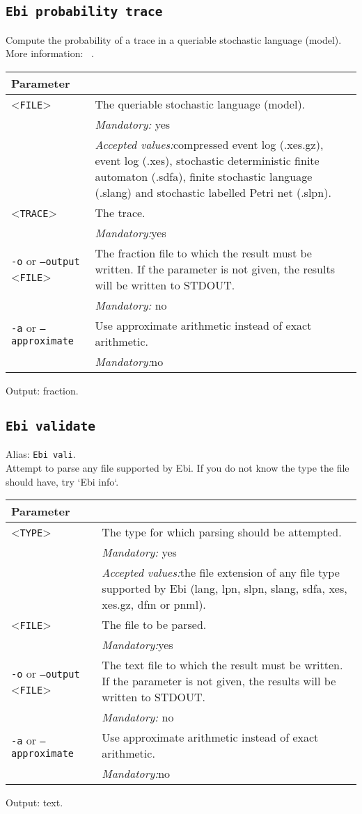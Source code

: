 {\subsection{\texttt{Ebi probability trace}}
Compute the probability of a trace in a queriable stochastic language (model).\\
More information: ~\cite{DBLP:journals/is/LeemansMM24}.\\
\begin{tabularx}{\linewidth}{lX}
\toprule
Parameter \\\midrule
<\texttt{FILE}>&The queriable stochastic language (model).\\
&\textit{Mandatory:} \quad yes\\
&\textit{Accepted values:}\quad compressed event log (.xes.gz), event log (.xes), stochastic deterministic finite automaton (.sdfa), finite stochastic language (.slang) and stochastic labelled Petri net (.slpn).\\
<\texttt{TRACE}>
&The trace.\\
&\textit{Mandatory:}\quad yes\\
\texttt{-o} or \texttt{--output} <\texttt{FILE}> &
The fraction file to which the result must be written. If the parameter is not given, the results will be written to STDOUT.\\
&\textit{Mandatory:} \quad no\\
\texttt{-a} or \texttt{--approximate} & Use approximate arithmetic instead of exact arithmetic.\\
&\textit{Mandatory:}\quad no\\
\bottomrule
\end{tabularx}
Output: fraction.
\subsection{\texttt{Ebi validate}}
Alias: \texttt{Ebi vali}.\\
Attempt to parse any file supported by Ebi. If you do not know the type the file should have, try `Ebi info`.\\
\begin{tabularx}{\linewidth}{lX}
\toprule
Parameter \\\midrule
<\texttt{TYPE}>&The type for which parsing should be attempted.\\
&\textit{Mandatory:} \quad yes\\
&\textit{Accepted values:}\quad the file extension of any file type supported by Ebi (lang, lpn, slpn, slang, sdfa, xes, xes.gz, dfm or pnml).\\
<\texttt{FILE}>
&The file to be parsed.\\
&\textit{Mandatory:}\quad yes\\
\texttt{-o} or \texttt{--output} <\texttt{FILE}> &
The text file to which the result must be written. If the parameter is not given, the results will be written to STDOUT.\\
&\textit{Mandatory:} \quad no\\
\texttt{-a} or \texttt{--approximate} & Use approximate arithmetic instead of exact arithmetic.\\
&\textit{Mandatory:}\quad no\\
\bottomrule
\end{tabularx}
Output: text.
}
